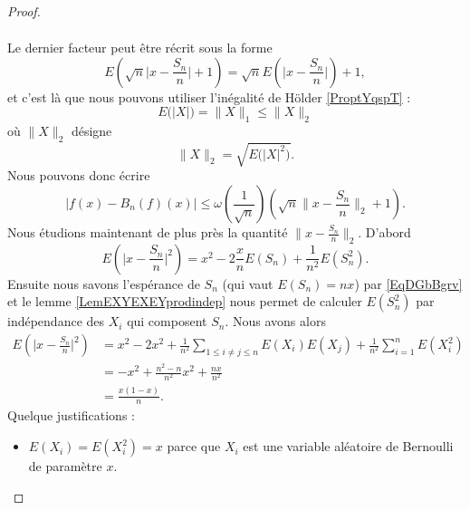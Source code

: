 \begin{proof}
\begin{enumerate}
\begin{subequations}
\begin{align}
            \end{align}
        \end{subequations}
        Le dernier facteur peut être récrit sous la forme
        \begin{equation}
            E\left( \sqrt{n}\big| x-\frac{ S_n }{ n } \big|+1 \right)=\sqrt{n}E\left( \big| x-\frac{ S_n }{ n } \big| \right)+1,
        \end{equation}
        et c'est là que nous pouvons utiliser l'inégalité de Hölder \ref{ProptYqspT} :
        \begin{equation}
            E\big( | X | \big)=\| X \|_1\leq\| X \|_2
        \end{equation}
        où \( \| X \|_2\) désigne
        \begin{equation}
            \| X \|_2=\sqrt{ E\big( | X |^2 \big)  }.
        \end{equation}
        Nous pouvons donc écrire
        \begin{equation}
            \big| f(x)-B_n(f)(x) \big|\leq \omega\left( \frac{1}{ \sqrt{n} } \right)\left( \sqrt{n}\big\| x-\frac{ S_n }{ n } \big\|_2+1 \right).
        \end{equation}
        Nous étudions maintenant de plus près la quantité \( \| x-\frac{ S_n }{ n } \|_2\). D'abord
        \begin{equation}
            E\left( \big| x-\frac{ S_n }{ n } \big|^2 \right)=x^2-2\frac{ x }{ n }E(S_n)+\frac{1}{ n^2 }E(S_n^2).
        \end{equation}
        Ensuite nous savons l'espérance de \( S_n\) (qui vaut \( E(S_n)=nx\)) par \eqref{EqDGbBgrv} et le lemme \ref{LemEXYEXEYprodindep} nous permet de calculer \( E(S_n^2)\) par indépendance des \( X_i\) qui composent \( S_n\). Nous avons alors
        \begin{subequations}
            \begin{align}
                E\left( \big| x-\frac{ S_n }{ n } \big|^2 \right)&=x^2-2x^2+\frac{1}{ n^2 }\sum_{1\leq i\neq j\leq n}E(X_i)E(X_j)+\frac{1}{ n^2 }\sum_{i=1}^nE(X_i^2)\\
                &=-x^2+\frac{ n^2-n }{ n^2 }x^2+\frac{ nx }{ n^2 }\\
                &=\frac{ x(1-x) }{ n }.
            \end{align}
        \end{subequations}
        Quelque justifications :
        \begin{itemize}
            \item \( E(X_i)=E(X_i^2)=x\) parce que \( X_i\) est une variable aléatoire de Bernoulli de paramètre \( x\).

\end{itemize}
\end{enumerate}
\end{proof}
